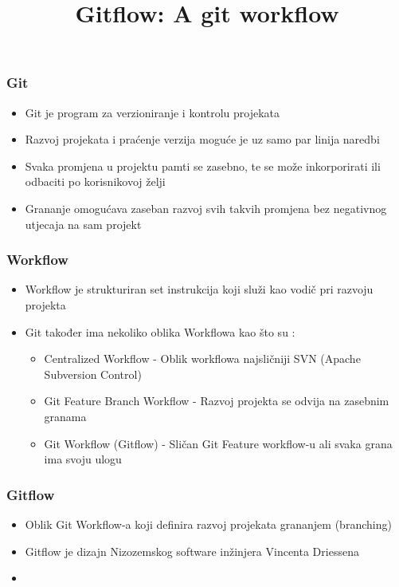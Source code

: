 \documentclass{beamer}
\title{Gitflow: A git workflow}
\begin{document}
\maketitle{}
\begin{frame}
	
\end{frame}
\begin{frame}
\frametitle{Git}
\begin{itemize}
	\item Git je program za verzioniranje i kontrolu projekata
	\item Razvoj projekata i praćenje verzija moguće je uz samo par linija naredbi
	\item Svaka promjena u projektu pamti se zasebno, te se može inkorporirati ili odbaciti po korisnikovoj želji
	\item Grananje omogućava zaseban razvoj svih takvih promjena bez negativnog utjecaja na sam projekt
\end{itemize}
\end{frame}

\begin{frame}
\frametitle{Workflow}
\begin{itemize}
	\item Workflow je strukturiran set instrukcija koji služi kao vodič pri razvoju projekta
	\item Git također ima nekoliko oblika Workflowa kao što su : 
		\begin{itemize}
			\item Centralized Workflow - Oblik workflowa najsličniji SVN (Apache Subversion Control)
			\item Git Feature Branch Workflow - Razvoj projekta se odvija na zasebnim granama
			\item Git Workflow (Gitflow) - Sličan Git Feature workflow-u ali svaka grana ima svoju ulogu
		\end{itemize}
\end{itemize}	
\end{frame}

\begin{frame}
\frametitle{Gitflow}
\begin{itemize}
	\item Oblik Git Workflow-a koji definira razvoj projekata grananjem (branching)
	\item Gitflow je dizajn Nizozemskog software inžinjera Vincenta Driessena
	\item 
\end{itemize}
\end{frame}
\end{document}
